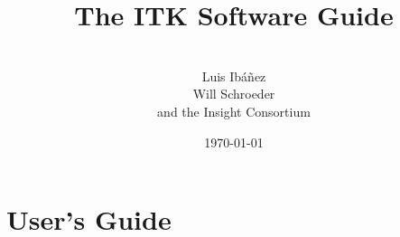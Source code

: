 \documentclass[twoside,titlepage]{InsightBook}
\title{The ITK Software Guide}
\author{\\Luis Ib\'{a}\~{n}ez\\Will Schroeder\\and the Insight Consortium}
\date{\today}
\newif\ifitkFullVersion
\begin{document}
\maketitle

\frontmatter


\ifitkFullVersion 


\fi

\tableofcontents


\mainmatter

\ifitkFullVersion
\part{Introduction}




\fi


\part{User's Guide}

\ifitkFullVersion

\fi

\ifitkFullVersion

\fi

\ifitkFullVersion

\fi

\ifitkFullVersion

\fi

\ifitkFullVersion

\fi

\ifitkFullVersion

\fi



\ifitkFullVersion
\part{Developer's Guide}



\fi

\backmatter


%
%

\listoffigures
\listoftables


%
%





%
%

\end{document}
